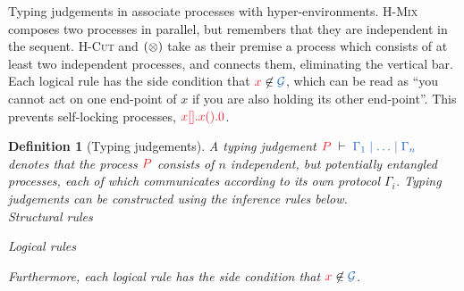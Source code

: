 \documentclass[submission,copyright,creativecommons]{eptcs}
\newtheorem{definition}[lemma]{Definition}
\begin{document}
Typing judgements in \hcp associate processes with hyper-environments. \textsc{H-Mix} composes two processes in parallel, but remembers that they are independent in the sequent. \textsc{H-Cut} and $(\otimes)$ take as their premise a process which consists of at least two independent processes, and connects them, eliminating the vertical bar. Each logical rule has the side condition that $\tm{x} \not\in \ty{\mathcal{G}}$, which can be read as ``you cannot act on one end-point of $x$ if you are also holding its other end-point''. This prevents self-locking processes, \eg $\tm{\piBoundSend{x}{}{\piRecv{x}{}{\piHalt}}}$.
\begin{definition}[Typing judgements]\label{def:hcp}
  A typing judgement $\seq[P]{\Gamma_1 \hsep \dots \hsep \Gamma_n}$ denotes that the process $\tm{P}$ consists of $n$ independent, but potentially entangled processes, each of which communicates according to its own protocol $\Gamma_i$. 
  Typing judgements can be constructed using the inference rules below. 
  \\[1\baselineskip]
  {Structural rules}
  \begin{center}
    \hcpInfAx
    \hcpInfCut
  \end{center}
  \begin{center}
    \hcpInfMix
    \hcpInfHalt
  \end{center}
  {Logical rules}
  \begin{center}
    \hcpInfBoundTens
    \hcpInfParr
  \end{center}
  \begin{center}
    \hcpInfOne
    \hcpInfBot
  \end{center}
  \begin{center}
  \end{center}
  \begin{center}
    \hcpInfWith
  \end{center}
  \begin{center}
    \hcpInfNil
    \hcpInfTop
  \end{center}
  Furthermore, each logical rule has the side condition that $\tm{x} \not\in \ty{\mathcal{G}}$.
\end{definition}\noindent
\end{document}

